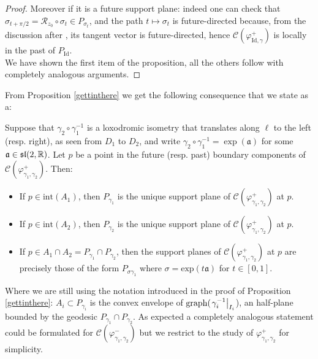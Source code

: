 \begin{proof}
    Moreover if it is a future support plane: indeed one can check that $\sigma_{t+\pi/2}=\mathcal{R}_{z_0}\circ\sigma_t\in P_{\sigma_t}$, and the path $t\mapsto\sigma_t$ is future-directed because, from the discussion after , its tangent vector is future-directed, hence $\mathcal{C}(\varphi_{\text{Id},\gamma}^+)$ is locally in the past of $P_{\text{Id}}$. \\
    We have shown the first item of the proposition, all the others follow with completely analogous arguments.
\end{proof}



From Proposition \ref{gettinthere} we get the following consequence that we state as a:

\begin{corollary}\label{53}
    Suppose that $\gamma_2\circ\gamma_1^{-1}$ is a loxodromic isometry that translates along $\ell$ to the left (resp. right), as seen from $D_1$ to $D_2$, and write $\gamma_2\circ\gamma_1^{-1}=\exp(\mathfrak{a})$ for some $\mathfrak{a}\in\mathfrak{sl}(2,\mathbb{R})$. Let $p$ be a point in the future (resp. past) boundary components of $\mathcal{C}(\varphi_{\gamma_1,\gamma_2}^{+}).$ Then:
    \begin{itemize}
        \item If $p\in\text{int}(A_1)$, then $P_{\gamma_1}$ is the unique support plane of $\mathcal{C}(\varphi_{\gamma_1,\gamma_2}^{+})$ at $p$. 
        \item If $p\in\text{int}(A_2)$, then $P_{\gamma_2}$ is the unique support plane of $\mathcal{C}(\varphi_{\gamma_1,\gamma_2}^{+})$ at $p$. 
        \item If $p\in A_1\cap A_2= P_{\gamma_1}\cap P_{\gamma_2}$, then the support planes of $\mathcal{C}(\varphi_{\gamma_1,\gamma_2}^{+})$ at $p$ are precisely those of the form $P_{\sigma\gamma_1}$ where $\sigma=\text{exp}(t\mathfrak{a})$ for $t\in [0,1].$  
    \end{itemize}

    
\end{corollary}

Where we are still using the notation introduced in the proof of Proposition \ref{gettinthere}: $A_i\subset P_{\gamma_i}$ is the convex envelope of $\text{graph}(\left.\gamma_i^{-1}\right|_{I_i}$), an half-plane bounded by the geodesic $P_{\gamma_1}\cap P_{\gamma_2}.$ As expected a completely analogous statement could be formulated for $\mathcal{C}(\varphi_{\gamma_1,\gamma_2}^{-})$ but we restrict to the study of $\varphi_{\gamma_1,\gamma_2}^{+}$ for simplicity. 

